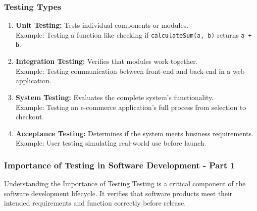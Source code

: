 \documentclass{beamer}
\begin{document}
\begin{frame}[fragile]
    \frametitle{Testing Types}
    \begin{enumerate}
        \item \textbf{Unit Testing:} Tests individual components or modules. \\
            Example: Testing a function like checking if \texttt{calculateSum(a, b)} returns \texttt{a + b}.
        \item \textbf{Integration Testing:} Verifies that modules work together. \\
            Example: Testing communication between front-end and back-end in a web application.
        \item \textbf{System Testing:} Evaluates the complete system's functionality. \\
            Example: Testing an e-commerce application's full process from selection to checkout.
        \item \textbf{Acceptance Testing:} Determines if the system meets business requirements. \\
            Example: User testing simulating real-world use before launch.
    \end{enumerate}
\end{frame}

\begin{frame}[fragile]
    \frametitle{Importance of Testing in Software Development - Part 1}
    \begin{block}{Understanding the Importance of Testing}
        Testing is a critical component of the software development lifecycle. It verifies that software products meet their intended requirements and function correctly before release.
    \end{block}
\end{frame}
\end{document}

